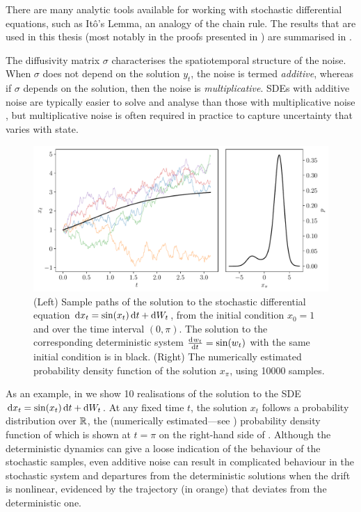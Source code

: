 There are many analytic tools available for working with stochastic differential equations, such as It\^o's Lemma, an analogy of the chain rule.
The results that are used in this thesis (most notably in the proofs presented in ) are summarised in .

The diffusivity matrix \(\sigma\) characterises the spatiotemporal structure of the noise.
When \(\sigma\) does not depend on the solution \(y_t\), the noise is termed \emph{additive}, whereas if \(\sigma\) depends on the solution, then the noise is \emph{multiplicative}.
SDEs with additive noise are typically easier to solve and analyse than those with multiplicative noise \citep{SanchoEtAl_1982_AnalyticalNumericalStudies}, but multiplicative noise is often required in practice to capture uncertainty that varies with state.

\begin{figure}
	\begin{center}
		\includegraphics[width=\textwidth]{chp02_background/figures/ou_solution.pdf}
		\caption{(Left) Sample paths of the solution to the stochastic differential equation \(\dif x_t = \sin\!\left(x_t\right)\dif t + \dif W_t\), from the initial condition \(x_0 = 1\) and over the time interval \((0,\pi)\).
			The solution to the corresponding deterministic system \(\od{w_t}{t} = \sin\!\left(w_t\right)\) with the same initial condition is in black.
			(Right) The numerically estimated probability density function of the solution \(x_\pi\), using 10000 samples.}
		\label{fig:sde_sol_sample}
	\end{center}
\end{figure}

As an example, in  we show 10 realisations of the solution to the SDE \(\dif x_t = \sin\!\left(x_t\right)\dif t + \dif W_t\).
At any fixed time \(t\), the solution \(x_t\) follows a probability distribution over \(\mathbb{R}\), the (numerically estimated---see ) probability density function of which is shown at \(t = \pi\) on the right-hand side of .
Although the deterministic dynamics can give a loose indication of the behaviour of the stochastic samples, even additive noise can result in complicated behaviour in the stochastic system and departures from the deterministic solutions when the drift is nonlinear, evidenced by the trajectory (in orange) that deviates from the deterministic one.


